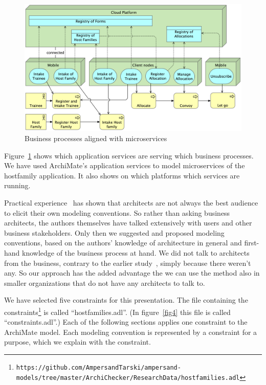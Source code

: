 \documentclass[sn-vancouver]{sn-jnl}%
\begin{document}
\begin{figure}[b]
 \centering
\includegraphics[clip=true, scale=0.07]{Services voor Uitvoering.png}
\caption{Business processes aligned with microservices}
\label{fig: Alignment of services with business processes}
\end{figure}

Figure~\ref{fig: Alignment of services with business processes} shows which application services are serving which business processes.
We have used ArchiMate's application services to model microservices of the hostfamily application.
It also shows on which platforms which services are running.

Practical experience~\cite{iceis22} has shown that architects are not always the best audience to elicit their own modeling conventions.
So rather than asking business architects, the authors themselves have talked extensively with users and other business stakeholders.
Only then we suggested and proposed modeling conventions,
based on the authors' knowledge of architecture in general and first-hand knowledge of the business process at hand.
We did not talk to architects from the business, contrary to the earlier study~\cite{iceis22}, simply because there weren't any.
So our approach has the added advantage the we can use the method also in smaller organizations that do not have any architects to talk to.

We have selected five constraints for this presentation.
The file containing the constraints\footnote{\tt\tiny https://github.com/AmpersandTarski/ampersand-models/tree/master/ArchiChecker/ResearchData/hostfamilies.adl}
is called ``hostfamilies.adl''.
(In figure~\ref{fig4} this file is called ``constraints.adl''.)
Each of the following sections applies one constraint to the ArchiMate model.
Each modeling convention is represented by a constraint for a purpose,
which we explain with the constraint.
\end{document}

